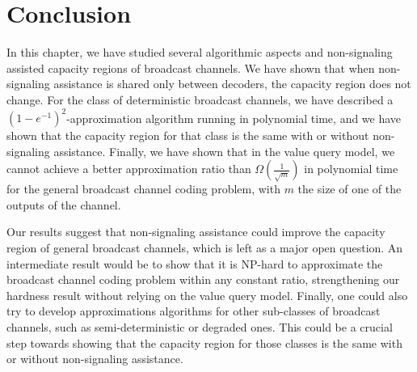 \section{Conclusion}
In this chapter, we have studied several algorithmic aspects and non-signaling assisted capacity regions of broadcast channels. We have shown that when non-signaling assistance is shared only between decoders, the capacity region does not change. For the class of deterministic broadcast channels, we have described a $(1-e^{-1})^2$-approximation algorithm running in polynomial time, and we have shown that the capacity region for that class is the same with or without non-signaling assistance. Finally, we have shown that in the value query model, we cannot achieve a better approximation ratio than $\Omega\left(\frac{1}{\sqrt{m}}\right)$ in polynomial time for the general broadcast channel coding problem, with $m$ the size of one of the outputs of the channel.

Our results suggest that non-signaling assistance could improve the capacity region of general broadcast channels, which is left as a major open question. An intermediate result would be to show that it is \textrm{NP}-hard to approximate the broadcast channel coding problem within any constant ratio, strengthening our hardness result without relying on the value query model. Finally, one could also try to develop approximations algorithms for other sub-classes of broadcast channels, such as semi-deterministic or degraded ones. This could be a crucial step towards showing that the capacity region for those classes is the same with or without non-signaling assistance.
